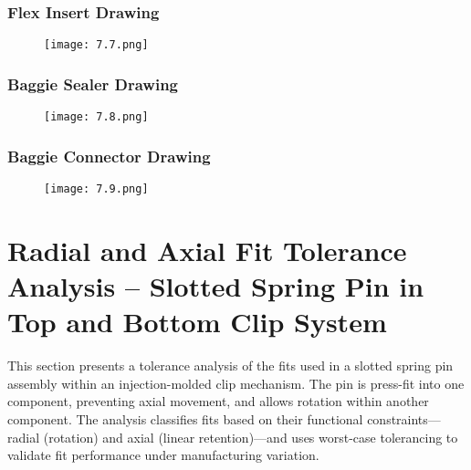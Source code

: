 \documentclass[12pt]{article}
\theoremstyle{definition} %
\theoremstyle{plain} %
\begin{document}
\pagebreak
\subsubsection*{Flex Insert Drawing}
\begin{figure}[htbp]
  \centering
  \texttt{[image: 7.7.png]}
  \caption{}
  \label{fig:}
\end{figure}

\pagebreak
\subsubsection*{Baggie Sealer Drawing}
\begin{figure}[htbp]
  \centering
  \texttt{[image: 7.8.png]}
  \caption{}
  \label{fig:}
\end{figure}

\pagebreak
\subsubsection*{Baggie Connector Drawing}
\begin{figure}[htbp]
  \centering
  \texttt{[image: 7.9.png]}
  \caption{}
  \label{fig:}
\end{figure}
\pagebreak

\section{Radial and Axial Fit Tolerance Analysis – Slotted Spring Pin in Top
and Bottom Clip System}

This section presents a tolerance analysis of the fits used in a slotted spring pin
assembly within an injection-molded clip mechanism. The pin is press-fit into one
component, preventing axial movement, and allows rotation within another
component. The analysis classifies fits based on their functional constraints—radial
(rotation) and axial (linear retention)—and uses worst-case tolerancing to validate fit
performance under manufacturing variation.
\end{document}
